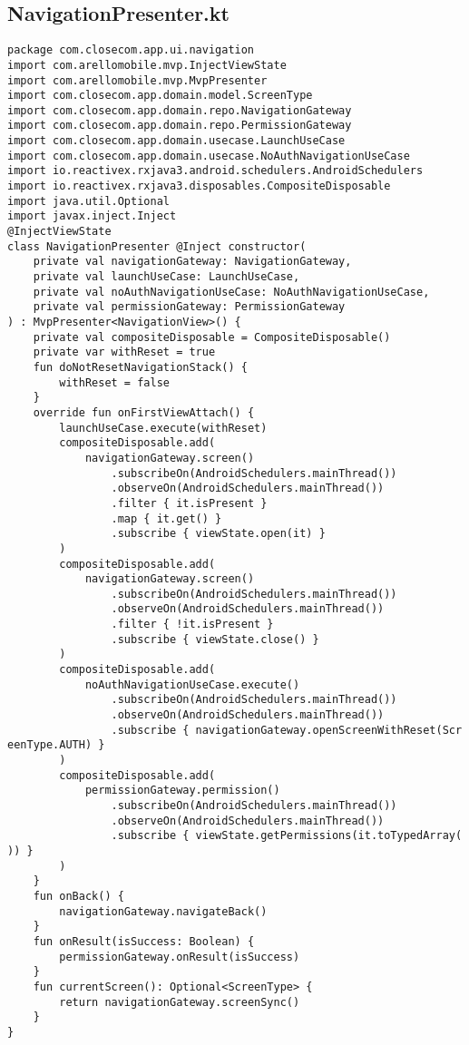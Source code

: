 \documentclass[listing]{espd}
\begin{document}
\subsection{NavigationPresenter.kt}
\begin{verbatim}
package com.closecom.app.ui.navigation
import com.arellomobile.mvp.InjectViewState
import com.arellomobile.mvp.MvpPresenter
import com.closecom.app.domain.model.ScreenType
import com.closecom.app.domain.repo.NavigationGateway
import com.closecom.app.domain.repo.PermissionGateway
import com.closecom.app.domain.usecase.LaunchUseCase
import com.closecom.app.domain.usecase.NoAuthNavigationUseCase
import io.reactivex.rxjava3.android.schedulers.AndroidSchedulers
import io.reactivex.rxjava3.disposables.CompositeDisposable
import java.util.Optional
import javax.inject.Inject
@InjectViewState
class NavigationPresenter @Inject constructor(
    private val navigationGateway: NavigationGateway,
    private val launchUseCase: LaunchUseCase,
    private val noAuthNavigationUseCase: NoAuthNavigationUseCase,
    private val permissionGateway: PermissionGateway
) : MvpPresenter<NavigationView>() {
    private val compositeDisposable = CompositeDisposable()
    private var withReset = true
    fun doNotResetNavigationStack() {
        withReset = false
    }
    override fun onFirstViewAttach() {
        launchUseCase.execute(withReset)
        compositeDisposable.add(
            navigationGateway.screen()
                .subscribeOn(AndroidSchedulers.mainThread())
                .observeOn(AndroidSchedulers.mainThread())
                .filter { it.isPresent }
                .map { it.get() }
                .subscribe { viewState.open(it) }
        )
        compositeDisposable.add(
            navigationGateway.screen()
                .subscribeOn(AndroidSchedulers.mainThread())
                .observeOn(AndroidSchedulers.mainThread())
                .filter { !it.isPresent }
                .subscribe { viewState.close() }
        )
        compositeDisposable.add(
            noAuthNavigationUseCase.execute()
                .subscribeOn(AndroidSchedulers.mainThread())
                .observeOn(AndroidSchedulers.mainThread())
                .subscribe { navigationGateway.openScreenWithReset(Scr
eenType.AUTH) }
        )
        compositeDisposable.add(
            permissionGateway.permission()
                .subscribeOn(AndroidSchedulers.mainThread())
                .observeOn(AndroidSchedulers.mainThread())
                .subscribe { viewState.getPermissions(it.toTypedArray(
)) }
        )
    }
    fun onBack() {
        navigationGateway.navigateBack()
    }
    fun onResult(isSuccess: Boolean) {
        permissionGateway.onResult(isSuccess)
    }
    fun currentScreen(): Optional<ScreenType> {
        return navigationGateway.screenSync()
    }
}
\end{verbatim}
\end{document}
